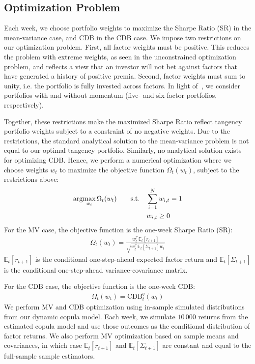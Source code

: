 
\subsection{Optimization Problem} %
\label{sub:optimization_problem}

Each week, we choose portfolio weights to maximize the Sharpe Ratio (SR) in the mean-variance case, and CDB in the CDB case. We impose two restrictions on our optimization problem. First, all factor weights must be positive. This reduces the problem with extreme weights, as seen in the unconstrained optimization problem, and reflects a view that an investor will not bet against factors that have generated a history of positive premia. Second, factor weights must sum to unity, i.e. the portfolio is fully invested across factors. In light of~\textcite{Asness2015}, we consider portfolios with and without momentum (five- and six-factor portfolios, respectively).

Together, these restrictions make the maximized Sharpe Ratio reflect tangency portfolio weights subject to a constraint of no negative weights. Due to the restrictions, the standard analytical solution to the mean-variance problem is not equal to our optimal tangency portfolio. Similarly, no analytical solution exists for optimizing CDB. Hence, we perform a numerical optimization where we choose weights $w_t$ to maximize the objective function $\Omega_t(w_t)$, subject to the restrictions above:
\begin{align}
  \arg\!\max_{w_t} \Omega_t(w_t)
    &&\text{\quad s.t.\quad} & \sum_{i=1}^N w_{i,t} = 1 \\
    &&                       & w_{i,t} \ge 0 \notag
\end{align}
For the MV case, the objective function is the one-week Sharpe Ratio (SR):
\begin{align}
  \Omega_t(w_t) = \frac{w_t^\top \mathbb{E}_t[r_{t+1}]}{\sqrt{w_t^\top \mathbb{E}_t[\Sigma_{t+1}] w_t}}
\end{align}
$\mathbb{E}_t[r_{t+1}]$ is the conditional one-step-ahead expected factor return and $\mathbb{E}_t[\Sigma_{t+1}]$ is the conditional one-step-ahead variance-covariance matrix. 

For the CDB case, the objective function is the one-week CDB:
\begin{align}
  \Omega_t(w_t) = \text{CDB}_t^q(w_t)
\end{align}
We perform MV and CDB optimization using in-sample simulated distributions from our dynamic copula model. Each week, we simulate $10\,000$ returns from the estimated copula model and use those outcomes as the conditional distribution of factor returns. We also perform MV optimization based on sample means and covariances, in which case $\mathbb{E}_t[r_{t+1}]$ and $\mathbb{E}_t[\Sigma_{t+1}]$ are constant and equal to the full-sample sample estimators.


